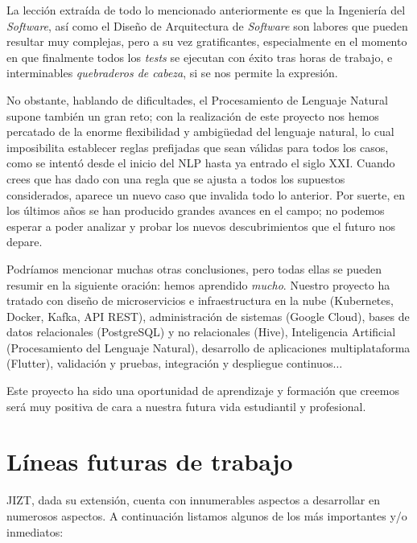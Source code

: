 \vspace{-0.3cm}
La lección extraída de todo lo mencionado anteriormente es que la Ingeniería del \emph{Software}, así como el Diseño de Arquitectura de \emph{Software} son labores que pueden resultar muy complejas, pero a su vez gratificantes, especialmente en el momento en que finalmente todos los \emph{tests} se ejecutan con éxito tras horas de trabajo, e interminables \emph{quebraderos de cabeza}, si se nos permite la expresión.

No obstante, hablando de dificultades, el Procesamiento de Lenguaje Natural supone también un gran reto; con la realización de este proyecto nos hemos percatado de la enorme flexibilidad y ambigüedad del lenguaje natural, lo cual imposibilita establecer reglas prefijadas que sean válidas para todos los casos, como se intentó desde el inicio del NLP hasta ya entrado el siglo XXI. Cuando crees que has dado con una regla que se ajusta a todos los supuestos considerados, aparece un nuevo caso que invalida todo lo anterior. Por suerte, en los últimos años se han producido grandes avances en el campo; no podemos esperar a poder analizar y probar los nuevos descubrimientos que el futuro nos depare.

Podríamos mencionar muchas otras conclusiones, pero todas ellas se pueden resumir en la siguiente oración: hemos aprendido \emph{mucho}. Nuestro proyecto ha tratado con diseño de microservicios e infraestructura en la nube (Kubernetes, Docker, Kafka, API REST), administración de sistemas (Google Cloud), bases de datos relacionales (PostgreSQL) y no relacionales (Hive), Inteligencia Artificial (Procesamiento del Lenguaje Natural), desarrollo de aplicaciones multiplataforma (Flutter), validación y pruebas, integración y despliegue continuos$\ldots$

Este proyecto ha sido una oportunidad de aprendizaje y formación que creemos será muy positiva de cara a nuestra futura vida estudiantil y profesional.


\section{Líneas futuras de trabajo}

JIZT, dada su extensión, cuenta con innumerables aspectos a desarrollar en numerosos aspectos. A continuación listamos algunos de los más importantes y/o inmediatos:

